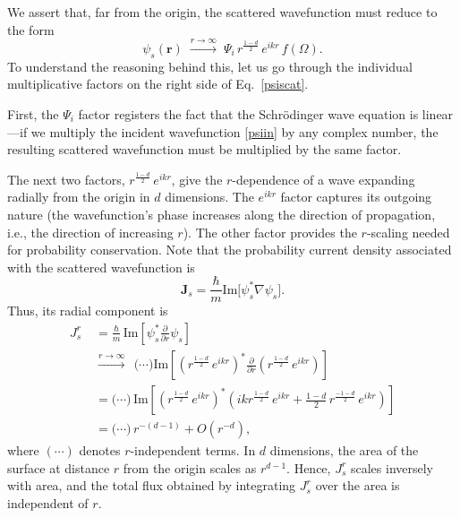 \documentclass[pra,12pt]{revtex4-2}
\begin{document}
We assert that, far from the origin, the scattered wavefunction must
reduce to the form
\begin{equation}
  \psi_s(\mathbf{r})\;  \overset{r\rightarrow\infty}{\longrightarrow}\; \Psi_i \, r^{\frac{1-d}{2}} \, e^{ikr} \, f(\Omega).
  \label{psiscat}
\end{equation}
To understand the reasoning behind this, let us go through the
individual multiplicative factors on the right side of
Eq.~\eqref{psiscat}.

First, the $\Psi_i$ factor registers the fact that the Schr\"odinger
wave equation is linear---if we multiply the incident wavefunction
\eqref{psiin} by any complex number, the resulting scattered
wavefunction must be multiplied by the same factor.

The next two factors, $r^{\frac{1-d}{2}} \, e^{ikr}$, give the
$r$-dependence of a wave expanding radially from the origin in $d$
dimensions.  The $e^{ikr}$ factor captures its outgoing nature (the
wavefunction's phase increases along the direction of propagation,
i.e., the direction of increasing $r$).  The other factor provides the
$r$-scaling needed for probability conservation.  Note that the
probability current density associated with the scattered wavefunction
is
\begin{equation}
  \mathbf{J}_s = \frac{\hbar}{m} \mathrm{Im}\big[\psi_s^*\nabla\psi_s\big].
\end{equation}
Thus, its radial component is
\begin{equation}
  \begin{aligned}J_{s}^r\; &= \frac{\hbar}{m}\, \mathrm{Im}\left[\psi_s^* \frac{\partial}{\partial r}\psi_s\right] \\
    &\overset{r\rightarrow\infty}{\longrightarrow}\;\, \big(\cdots\big)
    \mathrm{Im}\left[\left(r^{\frac{1-d}{2}} \, e^{ikr}\right)^* \frac{\partial}{\partial r} \left(r^{\frac{1-d}{2}} \, e^{ikr}\right)\right] \\
    &= \big(\cdots\big)\,
    \mathrm{Im}\left[\left(r^{\frac{1-d}{2}} \, e^{ikr}\right)^* \left(ik r^{\frac{1-d}{2}} \, e^{ikr} + \frac{1-d}{2} \, r^{\frac{-1-d}{2}} \, e^{ikr}\right)\right] \\
    &= \big(\cdots\big) \, r^{-(d-1)} + O(r^{-d}),
  \end{aligned}
  \label{Jsrcalc}
\end{equation}
where $(\cdots)$ denotes $r$-independent terms.  In $d$ dimensions,
the area of the surface at distance $r$ from the origin scales as
$r^{d-1}$.  Hence, $J_{s}^r$ scales inversely with area, and the total
flux obtained by integrating $J_{s}^r$ over the area is independent of
$r$.
\end{document}
